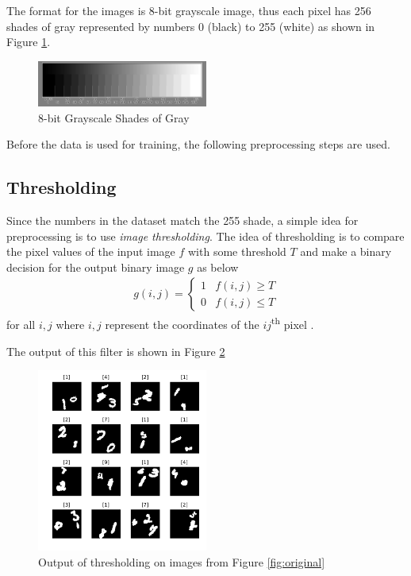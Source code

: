 \documentclass[letterpaper, 10 pt, conference]{ieeeconf}  %
\begin{document}
 The format for the images is 8-bit grayscale image, thus each pixel has 256 shades of gray represented by numbers 0 (black) to 255 (white) as shown in Figure \ref{fig:maxeig2}.

	
\begin{figure}[h]
	\begin{center}
			\includegraphics[width=0.5\textwidth]{figures/21stepwide8bit.jpg}  %
		\caption{8-bit Grayscale Shades of Gray}
		\label{fig:maxeig2}
	\end{center}
\end{figure}

Before the data is used for training, the following preprocessing steps are used.

\subsection{Thresholding} 
Since the numbers in the dataset match the 255 shade, a simple idea for preprocessing is to use \textit{image thresholding}. 
The idea of thresholding is to compare the pixel values of the input image $f$ with some threshold $T$ and make a binary decision for the output binary image $g$ as below
\begin{align}
g(i,j) = \begin{cases}
1 & f(i,j)\ge T\\
0 & f(i,j)\le T
\end{cases}
\end{align}
for all $i, j$ where $i, j$ represent the coordinates of the $ij$\textsuperscript{th} pixel \cite{bovik2009essential}.

The output of this filter is shown in Figure \ref{fig:thresholded}

\begin{figure}[h]
	\begin{center}
		\includegraphics[width=0.5\textwidth]{figures/thresholdDataset.pdf}  %
		\caption{Output of thresholding on images from Figure \ref{fig:original}}
		\label{fig:thresholded}
	\end{center}
\end{figure}
\end{document}
